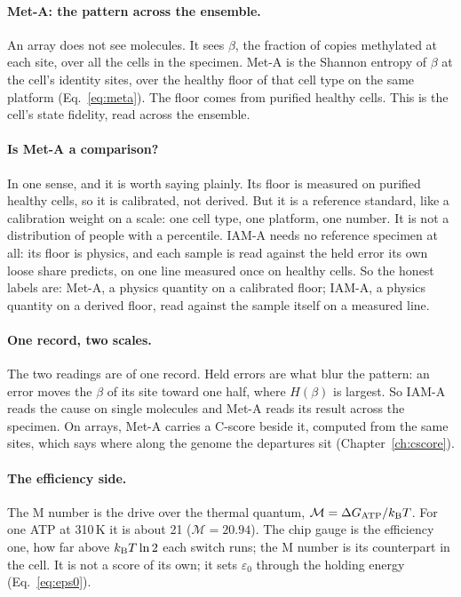 \paragraph{Met-A: the pattern across the ensemble.} An array does not see molecules. It sees $\beta$, the fraction of copies methylated at
each site, over all the cells in the specimen. Met-A is the Shannon entropy of $\beta$ at the cell's identity sites, over the healthy floor of
that cell type on the same platform (Eq.~\eqref{eq:meta}). The floor comes from purified healthy cells. \calibrated{} This is the cell's state
fidelity, read across the ensemble.

\paragraph{Is Met-A a comparison?} In one sense, and it is worth saying plainly. Its floor is measured on purified healthy cells, so it is
calibrated, not derived. But it is a reference standard, like a calibration weight on a scale: one cell type, one platform, one number. It is not
a distribution of people with a percentile. IAM-A needs no reference specimen at all: its floor is physics, and each sample is read against the held error its own loose share predicts, on one line measured once on healthy cells. So the honest labels are: Met-A, a physics quantity on a calibrated floor; IAM-A, a physics quantity on a derived floor, read against the sample itself on a measured line.

\paragraph{One record, two scales.} The two readings are of one record. Held errors are what blur the pattern: an error moves the $\beta$ of
its site toward one half, where $H(\beta)$ is largest. \derived{} So IAM-A reads the cause on single molecules and Met-A reads its result
across the specimen. On arrays, Met-A carries a C-score beside it, computed from the same sites, which says where along the genome the departures sit (Chapter~\ref{ch:cscore}). \calc

\paragraph{The efficiency side.} The M number is the drive over the thermal quantum, $\mathcal M=\Delta G_{\rm ATP}/k_{\mathrm B} T$. For one
ATP at 310\,K it is about 21 ($\mathcal M=20.94$). \calc{} The chip gauge is the efficiency one, how far above $k_{\mathrm B} T\ln2$ each switch runs; the M number is its counterpart in the cell. It is not a score of its own; it sets $\varepsilon_0$ through
the holding energy (Eq.~\eqref{eq:eps0}). \derived

